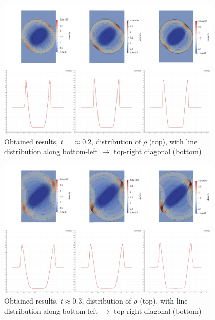 \begin{figure}[H]
	\begin{center}
		\includegraphics[width=0.95\textwidth]{img/mhd-blast/new/blast,noadapt3.jpg}
	\caption{Obtained results, $t = \approx 0.2$, distribution of $\rho$ (top), with line distribution along bottom-left $\rightarrow$ top-right diagonal (bottom)}
	\label{figure:blastNew02}
	\end{center}
\end{figure}
\vspace{-8mm}

\begin{figure}[H]
	\begin{center}
		\includegraphics[width=0.95\textwidth]{img/mhd-blast/new/blast,noadapt5.jpg}
	\caption{Obtained results, $t \approx 0.3$, distribution of $\rho$ (top), with line distribution along bottom-left $\rightarrow$ top-right diagonal (bottom)}
	\label{figure:blastNew03}
	\end{center}
\end{figure}
\vspace{-8mm}

